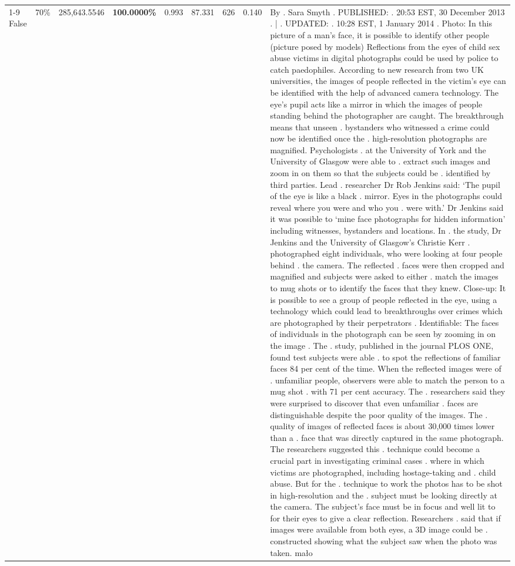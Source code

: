 \begin{table}[H]
\begin{tabular}{lllrlllll}
\cline{1-9} \cline{2-9}
False & 70\% & \color{red} 285,643.5546 & \bfseries \color{red} 100.0000\% & 0.993 & 87.331 & 626 & 0.140 & By . Sara Smyth . PUBLISHED: . 20:53 EST, 30 December 2013 . | . UPDATED: . 10:28 EST, 1 January 2014 . Photo: In this picture of a man's face, it is possible to identify other people (picture posed by models) Reflections from the eyes of child sex abuse victims in digital photographs could be used by police to catch paedophiles. According to new research from two UK universities, the images of people reflected in the victim's eye can be identified with the help of advanced camera technology. The eye's pupil acts like a mirror in which the images of people standing behind the photographer are caught. The breakthrough means that unseen . bystanders who witnessed a crime could now be identified once the . high-resolution photographs are magnified. Psychologists . at the University of York and the University of Glasgow were able to . extract such images and zoom in on them so that the subjects could be . identified by third parties. Lead . researcher Dr Rob Jenkins said: ‘The pupil of the eye is like a black . mirror. Eyes in the photographs could reveal where you were and who you . were with.' Dr Jenkins said it was possible to ‘mine face photographs for hidden information' including witnesses, bystanders and locations. In . the study, Dr Jenkins and the University of Glasgow's Christie Kerr . photographed eight individuals, who were looking at four people behind . the camera. The reflected . faces were then cropped and magnified and subjects were asked to either . match the images to mug shots or to identify the faces that they knew. Close-up: It is possible to see a group of people reflected in the eye, using a technology which could lead to breakthroughs over crimes which are photographed by their perpetrators . Identifiable: The faces of individuals in the photograph can be seen by zooming in on the image . The . study, published in the journal PLOS ONE, found test subjects were able . to spot the reflections of familiar faces 84 per cent of the time. When the reflected images were of . unfamiliar people, observers were able to match the person to a mug shot . with 71 per cent accuracy. The . researchers said they were surprised to discover that even unfamiliar . faces are distinguishable despite the poor quality of the images. The . quality of images of reflected faces is about 30,000 times lower than a . face that was directly captured in the same photograph. The researchers suggested this . technique could become a crucial part in investigating criminal cases . where in which victims are photographed, including hostage-taking and . child abuse. But for the . technique to work the photos has to be shot in high-resolution and the . subject must be looking directly at the camera. The subject's face must be in focus and well lit to for their eyes to give a clear reflection. Researchers . said that if images were available from both eyes, a 3D image could be . constructed showing what the subject saw when the photo was taken. mało \\

\end{tabular}
\end{table}
